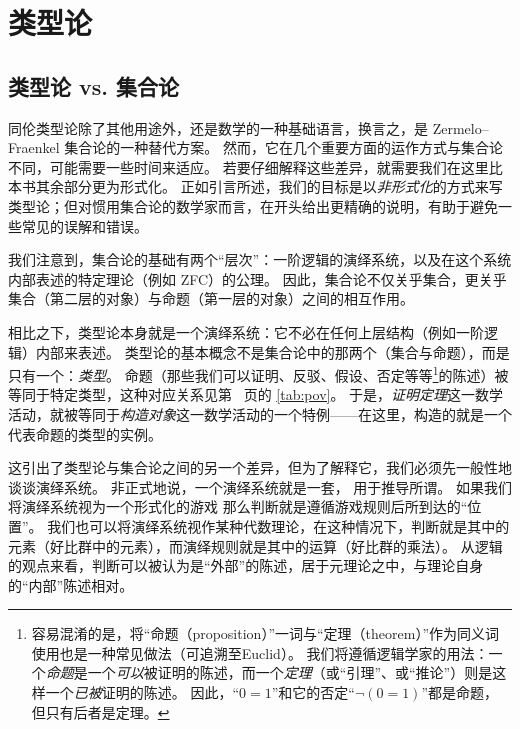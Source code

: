 \chapter{类型论}
\label{cha:typetheory}

\section{类型论 vs. 集合论}
\label{sec:types-vs-sets}
\label{sec:axioms}

同伦类型论除了其他用途外，还是数学的一种基础语言，换言之，是 Zermelo--Fraenkel 集合论的一种替代方案。
然而，它在几个重要方面的运作方式与集合论不同，可能需要一些时间来适应。
若要仔细解释这些差异，就需要我们在这里比本书其余部分更为形式化。
正如引言所述，我们的目标是以\emph{非形式化}的方式来写类型论；但对惯用集合论的数学家而言，在开头给出更精确的说明，有助于避免一些常见的误解和错误。

我们注意到，集合论的基础有两个“层次”：一阶逻辑的演绎系统，以及在这个系统内部表述的特定理论（例如 ZFC）的公理。
因此，集合论不仅关乎集合，更关乎集合（第二层的对象）与命题（第一层的对象）之间的相互作用。

相比之下，类型论本身就是一个演绎系统：它不必在任何上层结构（例如一阶逻辑）内部来表述。
类型论的基本概念不是集合论中的那两个（集合与命题），而是只有一个：\emph{类型}。
命题（那些我们可以证明、反驳、假设、否定等等\footnote{容易混淆的是，将“命题（proposition）”一词与“定理（theorem）”作为同义词使用也是一种常见做法（可追溯至Euclid）。
  我们将遵循逻辑学家的用法：一个\emph{命题}是一个\emph{可以}被证明的陈述，而一个\emph{定理}（或“引理”、或“推论”）则是这样一个\emph{已被}证明的陈述。
因此，“$0=1$”和它的否定“$\neg (0=1)$”都是命题，但只有后者是定理。}的陈述）被等同于特定类型，这种对应关系见第~\pageref{tab:pov} 页的 \cref{tab:pov}。
于是，\emph{证明定理}这一数学活动，就被等同于\emph{构造对象}这一数学活动的一个特例——在这里，构造的就是一个代表命题的类型的实例。

%
这引出了类型论与集合论之间的另一个差异，但为了解释它，我们必须先一般性地谈谈演绎系统。
非正式地说，一个演绎系统就是一套，
%
用于推导所谓。
%
如果我们将演绎系统视为一个形式化的游戏%
那么判断就是遵循游戏规则后所到达的“位置”。
我们也可以将演绎系统视作某种代数理论，在这种情况下，判断就是其中的元素（好比群中的元素），而演绎规则就是其中的运算（好比群的乘法）。
从逻辑的观点来看，判断可以被认为是“外部”的陈述，居于元理论之中，与理论自身的“内部”陈述相对。

